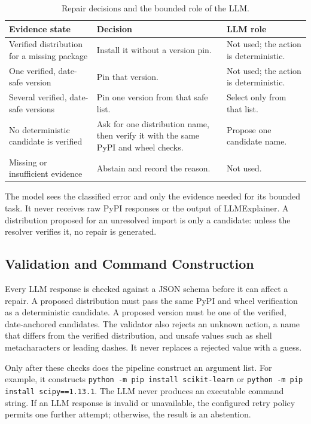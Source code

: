 \begin{table}[htbp]
  \centering
  \small
  \begin{tabular}{|>{\raggedright\arraybackslash}p{3.25cm}|>{\raggedright\arraybackslash}p{4.55cm}|>{\raggedright\arraybackslash}p{4.2cm}|}
    \hline
    \textbf{Evidence state} & \textbf{Decision} & \textbf{LLM role} \\
    \hline
    Verified distribution for a missing package & Install it without a version pin. & Not used; the action is deterministic. \\
    \hline
    One verified, date-safe version & Pin that version. & Not used; the action is deterministic. \\
    \hline
    Several verified, date-safe versions & Pin one version from that safe list. & Select only from that list. \\
    \hline
    No deterministic candidate is verified & Ask for one distribution name, then verify it with the same PyPI and wheel checks. & Propose one candidate name. \\
    \hline
    Missing or insufficient evidence & Abstain and record the reason. & Not used. \\
    \hline
  \end{tabular}
  \caption{Repair decisions and the bounded role of the LLM.}
  \label{tab:m-repair-decisions}
\end{table}

The model sees the classified error and only the evidence needed for its bounded
task. It never receives raw PyPI responses or the output of LLMExplainer. A
distribution proposed for an unresolved import is only a candidate: unless the
resolver verifies it, no repair is generated.


\subsection{Validation and Command Construction}

Every LLM response is checked against a JSON schema before it can affect a
repair. A proposed distribution must pass the same PyPI and wheel verification
as a deterministic candidate. A proposed version must be one of the verified,
date-anchored candidates. The validator also rejects an unknown action, a name
that differs from the verified distribution, and unsafe values such as shell
metacharacters or leading dashes. It never replaces a rejected value with a
guess.

Only after these checks does the pipeline construct an argument list. For
example, it constructs \texttt{python -m pip install scikit-learn} or
\texttt{python -m pip install scipy==1.13.1}. The LLM never produces an
executable command string. If an LLM response is invalid or unavailable, the
configured retry policy permits one further attempt; otherwise, the result is
an abstention.


